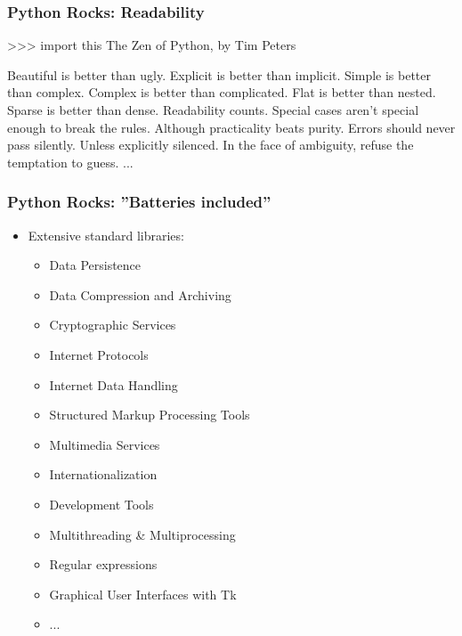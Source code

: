 \documentclass[t,10pt,compress=false,usepdftitle=false]{beamer}
\begin{document}
\begin{frame}[fragile]
    \frametitle{Python Rocks: Readability}
\begin{myColorBox}{0.9}{}
\begin{semiverbatim}
\small
>>> import this
The Zen of Python, by Tim Peters

Beautiful is better than ugly.
Explicit is better than implicit.
Simple is better than complex.
Complex is better than complicated.
Flat is better than nested.
Sparse is better than dense.
Readability counts.
Special cases aren't special enough to break the rules.
Although practicality beats purity.
Errors should never pass silently.
Unless explicitly silenced.
In the face of ambiguity, refuse the temptation to guess.
...
\end{semiverbatim}
\end{myColorBox}
\end{frame}

\begin{frame}[fragile]
    \frametitle{Python Rocks: ''Batteries included''}
    \begin{itemize}
        \item Extensive standard libraries:
        \begin{itemize}
            \item Data Persistence
            \item Data Compression and Archiving
            \item Cryptographic Services
            \item Internet Protocols
            \item Internet Data Handling
            \item Structured Markup Processing Tools
            \item Multimedia Services
            \item Internationalization
            \item Development Tools
            \item Multithreading \& Multiprocessing
            \item Regular expressions
            \item Graphical User Interfaces with Tk
            \item ...
        \end{itemize}
    \end{itemize}
\end{frame}
\end{document}

